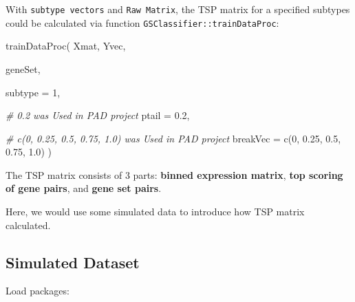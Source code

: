 \documentclass[
]{book}
\newenvironment{Shaded}{\begin{snugshade}}{\end{snugshade}}
\newcommand{\AttributeTok}[1]{\textcolor[rgb]{0.77,0.63,0.00}{#1}}
\newcommand{\CommentTok}[1]{\textcolor[rgb]{0.56,0.35,0.01}{\textit{#1}}}
\newcommand{\DecValTok}[1]{\textcolor[rgb]{0.00,0.00,0.81}{#1}}
\newcommand{\FloatTok}[1]{\textcolor[rgb]{0.00,0.00,0.81}{#1}}
\newcommand{\FunctionTok}[1]{\textcolor[rgb]{0.00,0.00,0.00}{#1}}
\newcommand{\NormalTok}[1]{#1}
\begin{document}
With \texttt{subtype\ vectors} and \texttt{Raw\ Matrix}, the TSP matrix for a specified subtypes could be calculated via function \texttt{GSClassifier::trainDataProc}:

\begin{Shaded}
\begin{Highlighting}[]
\FunctionTok{trainDataProc}\NormalTok{(}
\NormalTok{  Xmat, Yvec,}
  
\NormalTok{  geneSet, }

  \AttributeTok{subtype =} \DecValTok{1}\NormalTok{, }
  
  \CommentTok{\# 0.2 was Used in PAD project}
  \AttributeTok{ptail =} \FloatTok{0.2}\NormalTok{,}
  
  \CommentTok{\# c(0, 0.25, 0.5, 0.75, 1.0) was Used in PAD project}
  \AttributeTok{breakVec =} \FunctionTok{c}\NormalTok{(}\DecValTok{0}\NormalTok{, }\FloatTok{0.25}\NormalTok{, }\FloatTok{0.5}\NormalTok{, }\FloatTok{0.75}\NormalTok{, }\FloatTok{1.0}\NormalTok{)}
\NormalTok{)}
\end{Highlighting}
\end{Shaded}

The TSP matrix consists of 3 parts: \textbf{binned expression matrix}, \textbf{top scoring of gene pairs}, and \textbf{gene set pairs}.

Here, we would use some simulated data to introduce how TSP matrix calculated.

\hypertarget{simulated-dataset}{%
\subsection{Simulated Dataset}\label{simulated-dataset}}

Load packages:
\end{document}
